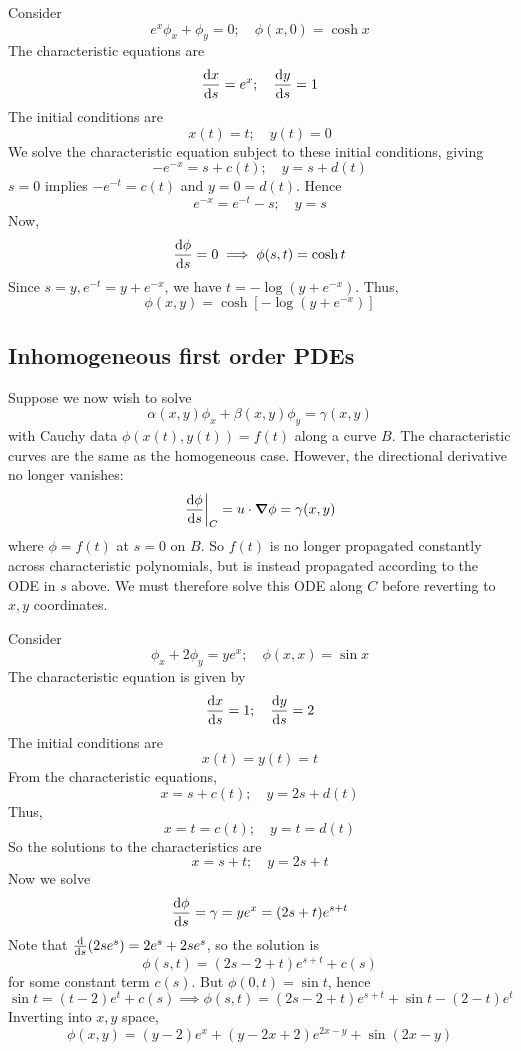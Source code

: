 \begin{example}
	Consider
	\[
		e^x \phi_x + \phi_y = 0;\quad \phi(x,0) = \cosh x
	\]
	The characteristic equations are
	\[
		\dv{x}{s} = e^x;\quad \dv{y}{s} = 1
	\]
	The initial conditions are
	\[
		x(t) = t;\quad y(t) = 0
	\]
	We solve the characteristic equation subject to these initial conditions, giving
	\[
		-e^{-x} = s + c(t);\quad y = s + d(t)
	\]
	\( s = 0 \) implies \( -e^{-t} = c(t) \) and \( y = 0 = d(t) \).
	Hence
	\[
		e^{-x} = e^{-t} - s;\quad y = s
	\]
	Now,
	\[
		\dv{\phi}{s} = 0 \implies \phi(s,t) = \cosh t
	\]
	Since \( s = y, e^{-t} = y + e^{-x} \), we have \( t = -\log(y + e^{-x}) \).
	Thus,
	\[
		\phi(x,y) = \cosh[-\log(y + e^{-x})]
	\]
\end{example}

\subsection{Inhomogeneous first order PDEs}
Suppose we now wish to solve
\[
	\alpha(x,y) \phi_x + \beta(x,y) \phi_y = \gamma(x,y)
\]
with Cauchy data \( \phi(x(t), y(t)) = f(t) \) along a curve \( B \).
The characteristic curves are the same as the homogeneous case.
However, the directional derivative no longer vanishes:
\[
	\eval{\dv{\phi}{s}}_C = u \cdot \grad{\phi} = \gamma(x,y)
\]
where \( \phi = f(t) \) at \( s = 0 \) on \( B \).
So \( f(t) \) is no longer propagated constantly across characteristic polynomials, but is instead propagated according to the ODE in \( s \) above.
We must therefore solve this ODE along \( C \) before reverting to \( x,y \) coordinates.
\begin{example}
	Consider
	\[
		\phi_x + 2 \phi_y = ye^x;\quad \phi(x,x) = \sin x
	\]
	The characteristic equation is given by
	\[
		\dv{x}{s} = 1;\quad \dv{y}{s} = 2
	\]
	The initial conditions are
	\[
		x(t) = y(t) = t
	\]
	From the characteristic equations,
	\[
		x = s + c(t);\quad y = 2s + d(t)
	\]
	Thus,
	\[
		x = t = c(t);\quad y = t = d(t)
	\]
	So the solutions to the characteristics are
	\[
		x = s + t;\quad y = 2s + t
	\]
	Now we solve
	\[
		\dv{\phi}{s} = \gamma = y e^x = (2s+t)e^{s+t}
	\]
	Note that \( \dv{s} \qty(2se^s) = 2e^s + 2se^s \), so the solution is
	\[
		\phi(s,t) = (2s - 2 + t)e^{s+t} + c(s)
	\]
	for some constant term \( c(s) \).
	But \( \phi(0,t) = \sin t \), hence
	\[
		\sin t = (t-2)e^t + c(s) \implies \phi(s,t) = (2s-2+t)e^{s+t} + \sin t - (2-t)e^t
	\]
	Inverting into \( x,y \) space,
	\[
		\phi(x,y) = (y-2)e^x + (y-2x+2)e^{2x-y} + \sin(2x-y)
	\]
\end{example}


